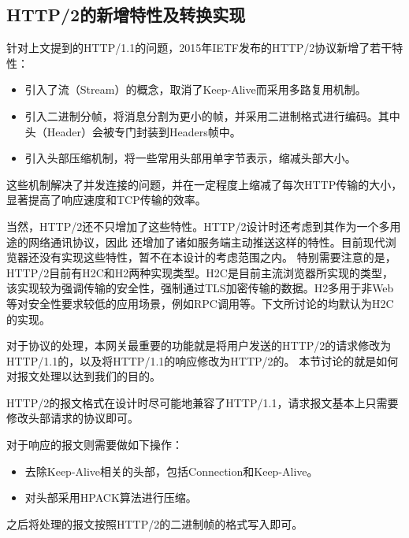 \documentclass[twoside]{CUGThesis}
\begin{document}
	\subsection{HTTP/2的新增特性及转换实现}
	针对上文提到的HTTP/1.1的问题，2015年IETF发布的HTTP/2协议新增了若干特性：
	\begin{itemize}
		\item 引入了流（Stream）的概念，取消了Keep-Alive而采用多路复用机制。
		\item 引入二进制分帧，将消息分割为更小的帧，并采用二进制格式进行编码。其中头（Header）会被专门封装到Headers帧中。
		\item 引入头部压缩机制，将一些常用头部用单字节表示，缩减头部大小。
	\end{itemize} \par
	这些机制解决了并发连接的问题，并在一定程度上缩减了每次HTTP传输的大小，显著提高了响应速度和TCP传输的效率\cite{de2015http}。\par 
	当然，HTTP/2还不只增加了这些特性。HTTP/2设计时还考虑到其作为一个多用途的网络通讯协议，因此
	还增加了诸如服务端主动推送这样的特性。目前现代浏览器还没有实现这些特性，暂不在本设计的考虑范围之内。
	特别需要注意的是，HTTP/2目前有H2C和H2两种实现类型\cite{belshe2015hypertext}。H2C是目前主流浏览器所实现的类型，
	该实现较为强调传输的安全性，强制通过TLS加密传输的数据。H2多用于非Web等对安全性要求较低的应用场景，例如RPC调用等。下文所讨论的均默认为H2C的实现。\par
	对于协议的处理，本网关最重要的功能就是将用户发送的HTTP/2的请求修改为HTTP/1.1的，以及将HTTP/1.1的响应修改为HTTP/2的。 
	本节讨论的就是如何对报文处理以达到我们的目的。\par 
	HTTP/2的报文格式在设计时尽可能地兼容了HTTP/1.1，请求报文基本上只需要修改头部请求的协议即可。\par 
	对于响应的报文则需要做如下操作：\par 
	\begin{itemize}
		\item 去除Keep-Alive相关的头部，包括Connection和Keep-Alive。
		\item 对头部采用HPACK算法\cite{peon2015hpack}进行压缩。
	\end{itemize}
	之后将处理的报文按照HTTP/2的二进制帧的格式写入即可。
\end{document}
